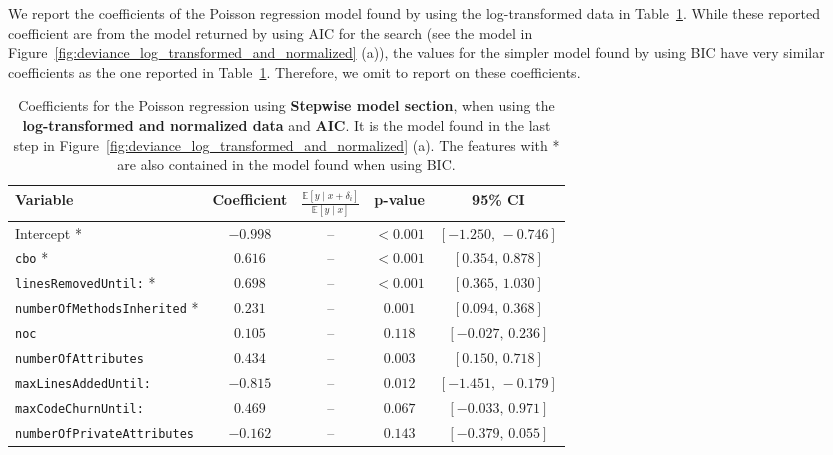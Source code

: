 We report the coefficients of the Poisson regression model found by using the log-transformed data in Table~\ref{tab:coefficients_poisson_stepwise_log_normalized}.
While these reported coefficient are from the model returned by using AIC for the search (see the model in Figure~\ref{fig:deviance_log_transformed_and_normalized} (a)), the values for the simpler model found by using BIC have very similar coefficients as the one reported in Table~\ref{tab:coefficients_poisson_stepwise_log_normalized}. Therefore, we omit to report on these coefficients.


\begin{table}[htbp]
    \centering
    \begin{tabular}{l c c c c}
        \toprule
        \textbf{Variable} & \textbf{Coefficient} & $\frac{\mathbb{E}[y\mid x+\delta_i]}{\mathbb{E}[y\mid x]}$ & \textbf{p-value} & \textbf{95\% CI} \\
        \midrule
        Intercept * & $-0.998$ & -- & $<0.001$ & $[-1.250,\,-0.746]$ \\
        \texttt{cbo} * & $0.616$ & -- & $<0.001$ & $[0.354,\,0.878]$ \\
        \texttt{linesRemovedUntil:} * & $0.698$ & -- & $<0.001$ & $[0.365,\,1.030]$ \\
        \texttt{numberOfMethodsInherited} * & $0.231$ & -- & $0.001$ & $[0.094,\,0.368]$ \\
        \texttt{noc} & $0.105$ & -- & $0.118$ & $[-0.027,\,0.236]$ \\
        \texttt{numberOfAttributes} & $0.434$ & -- & $0.003$ & $[0.150,\,0.718]$ \\
        \texttt{maxLinesAddedUntil:} & $-0.815$ & -- & $0.012$ & $[-1.451,\,-0.179]$ \\
        \texttt{maxCodeChurnUntil:} & $0.469$ & -- & $0.067$ & $[-0.033,\,0.971]$ \\
        \texttt{numberOfPrivateAttributes} & $-0.162$ & -- & $0.143$ & $[-0.379,\,0.055]$ \\
        \bottomrule
    \end{tabular}
    \caption{Coefficients for the Poisson regression using \textbf{Stepwise model section}, when using the \textbf{log-transformed and normalized data} and \textbf{AIC}. It is the model found in the last step in Figure~\ref{fig:deviance_log_transformed_and_normalized} (a). The features with * are also contained in the model found when using BIC.}
    \label{tab:coefficients_poisson_stepwise_log_normalized}
\end{table}

